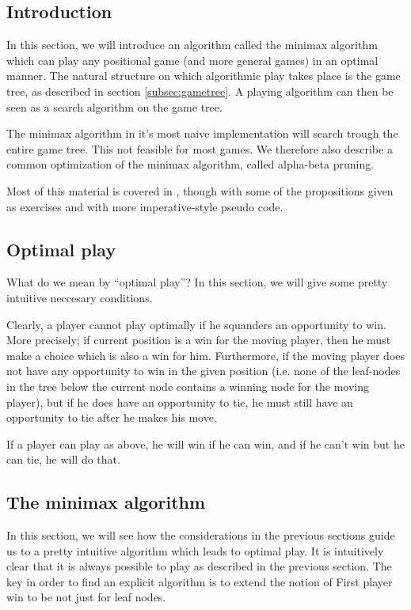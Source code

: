 \subsection{Introduction}

In this section, we will introduce an algorithm called the minimax algorithm which can play any positional game (and more general games) in an optimal manner.
The natural structure on which algorithmic play takes place is the game tree, as described in section \ref{subsec:gametree}.
A playing algorithm can then be seen as a search algorithm on the game tree.

The minimax algorithm in it's most naive implementation will search trough the entire game tree. This not feasible for most games.
We therefore also describe a common optimization of the minimax algorithm, called alpha-beta pruning.


Most of this material is covered in \citep{aimodernapproach}, though with some of the propositions given as exercises and with more imperative-style pseudo code.

\subsection{Optimal play}

What do we mean by ``optimal play''?
In this section, we will give some pretty intuitive neccesary conditions.

Clearly, a player cannot play optimally if he squanders an opportunity to win.
More precisely; if current position is a win for the moving player, then he must make a choice which is also a win for him.
Furthermore, if the moving player does not have any opportunity to win in the given position (i.e. none of the leaf-nodes in the tree below the current node contains a winning node for the moving player), but if he does have an opportunity to tie, he must still have an opportunity to tie after he makes his move.

If a player can play as above, he will win if he can win, and if he can't win but he can tie, he will do that.

\subsection{The minimax algorithm}
\label{sec:minimax}

In this section, we will see how the considerations in the previous sections guide us to a pretty intuitive algorithm which leads to optimal play.
It is intuitively clear that it is always possible to play as described in the previous section.
The key in order to find an explicit algorithm is to extend the notion of First player win to be not just for leaf nodes.

